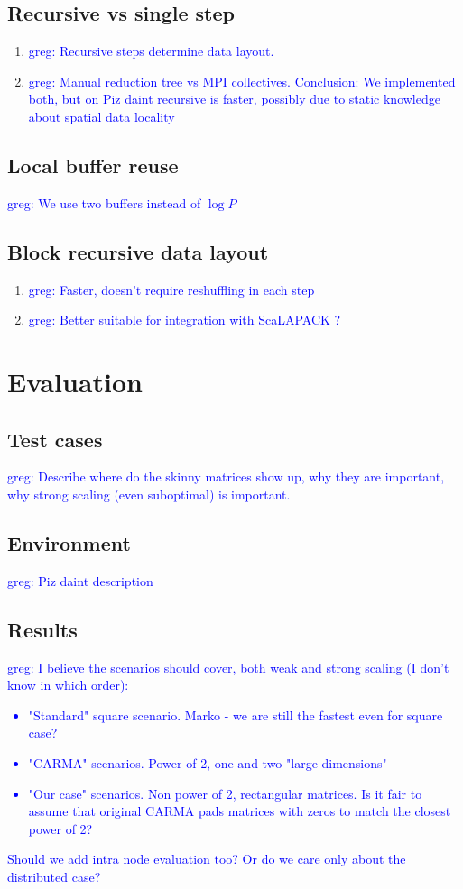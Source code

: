\documentclass[sigconf]{acmart}
\newcommand\greg[1]{\textcolor{blue}{greg: #1}}
\begin{document}
\subsection{Recursive vs single step}
\begin{enumerate}
	\item \greg{Recursive steps determine data layout.}
	\item \greg{Manual reduction tree vs MPI collectives. Conclusion: We 
	implemented both, but on Piz daint recursive is faster, possibly due to 
	static knowledge about spatial data locality}
\end{enumerate}
\subsection{Local buffer reuse}
\greg{We use two buffers instead of $\log P$}
\subsection{Block recursive data layout}
\begin{enumerate}
	\item \greg{Faster, doesn't require reshuffling in each step}
	\item \greg{Better suitable for integration with ScaLAPACK ?}
\end{enumerate}


\section{Evaluation}
\subsection{Test cases}
\greg{Describe where do the skinny matrices show up, why they are important, 
why strong scaling (even suboptimal) is important.}
\subsection{Environment}
\greg{Piz daint description}
\subsection{Results}
\greg{I believe the scenarios should cover, both weak and strong scaling (I 
don't know in which order):
\begin{itemize}
	\item "Standard" square scenario. Marko - we are still the fastest even for 
	square case?
	\item "CARMA" scenarios. Power of 2, one and two "large dimensions"
	\item "Our case" scenarios. Non power of 2, rectangular matrices. Is it 
	fair to assume that original CARMA pads matrices with zeros to match the 
	closest power of 2?
\end{itemize}
Should we add intra node evaluation too? Or do we care only about the 
distributed case?
}
\end{document}
